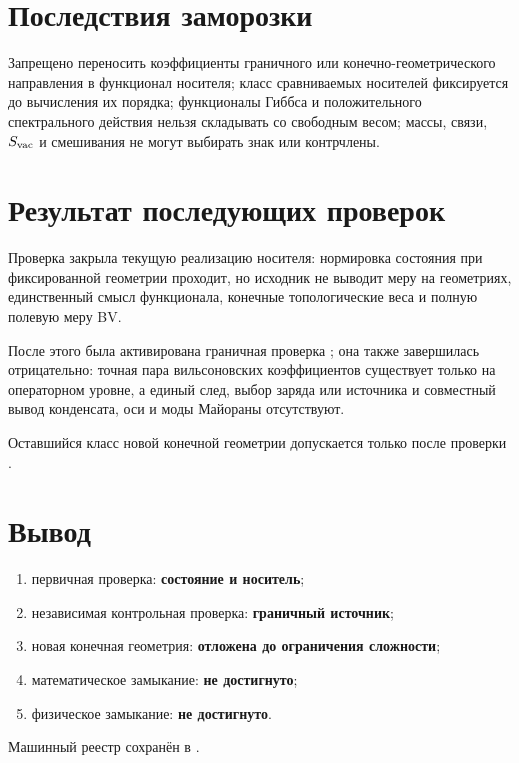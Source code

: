\section{Последствия заморозки}

Запрещено переносить коэффициенты граничного или конечно-геометрического
направления в функционал носителя; класс сравниваемых носителей фиксируется
до вычисления их порядка; функционалы Гиббса и положительного спектрального
действия нельзя складывать со свободным весом; массы, связи, \(S_{\rm vac}\)
и смешивания не могут выбирать знак или контрчлены.

\section{Результат последующих проверок}

Проверка  закрыла текущую
реализацию носителя: нормировка состояния при фиксированной геометрии
проходит, но исходник не выводит меру на геометриях, единственный смысл
функционала, конечные топологические веса и полную полевую меру BV.

После этого была активирована граничная проверка
; она также завершилась
отрицательно: точная пара вильсоновских коэффициентов существует только на
операторном уровне, а единый след, выбор заряда или источника и совместный
вывод конденсата, оси и моды Майораны отсутствуют.

Оставшийся класс новой конечной геометрии допускается только после проверки
.

\section{Вывод}

\begin{protocol}
\begin{enumerate}
 \item первичная проверка: \textbf{состояние и носитель};
 \item независимая контрольная проверка: \textbf{граничный источник};
 \item новая конечная геометрия: \textbf{отложена до ограничения сложности};
 \item математическое замыкание: \textbf{не достигнуто};
 \item физическое замыкание: \textbf{не достигнуто}.
\end{enumerate}
\end{protocol}

Машинный реестр сохранён в
.